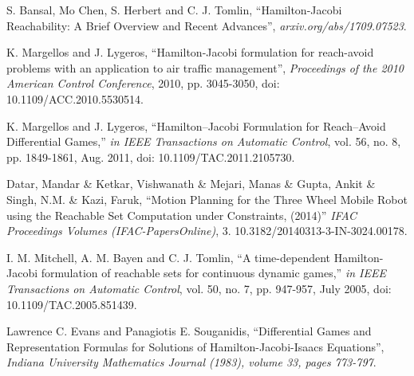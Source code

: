\begin{thebibliography}{1}


S. Bansal, Mo Chen, S. Herbert and C. J. Tomlin, ``Hamilton-Jacobi Reachability: A Brief Overview and Recent Advances'',
\emph{arxiv.org/abs/1709.07523}.

K. Margellos and J. Lygeros, ``Hamilton-Jacobi formulation for reach-avoid problems with an application to air traffic management'',
\emph{Proceedings of the 2010 American Control Conference}, 2010, pp. 3045-3050, doi: 10.1109/ACC.2010.5530514.

K. Margellos and J. Lygeros, ``Hamilton–Jacobi Formulation for Reach–Avoid Differential Games,''
\emph{in IEEE Transactions on Automatic Control}, vol. 56, no. 8, pp. 1849-1861, Aug. 2011, doi: 10.1109/TAC.2011.2105730.

Datar, Mandar \& Ketkar, Vishwanath \& Mejari, Manas \& Gupta, Ankit \& Singh, N.M. \& Kazi, Faruk, ``Motion Planning for the Three Wheel Mobile Robot using the Reachable Set Computation under Constraints, (2014)''
\emph{IFAC Proceedings Volumes (IFAC-PapersOnline)}, 3. 10.3182/20140313-3-IN-3024.00178.

I. M. Mitchell, A. M. Bayen and C. J. Tomlin, ``A time-dependent Hamilton-Jacobi formulation of reachable sets for continuous dynamic games,''
\emph{in IEEE Transactions on Automatic Control}, vol. 50, no. 7, pp. 947-957, July 2005, doi: 10.1109/TAC.2005.851439.

Lawrence C. Evans and Panagiotis E. Souganidis, ``Differential Games and Representation Formulas for Solutions of Hamilton-Jacobi-Isaacs Equations'',
\emph{Indiana University Mathematics Journal (1983), volume 33, pages 773-797}.
\end{thebibliography}
